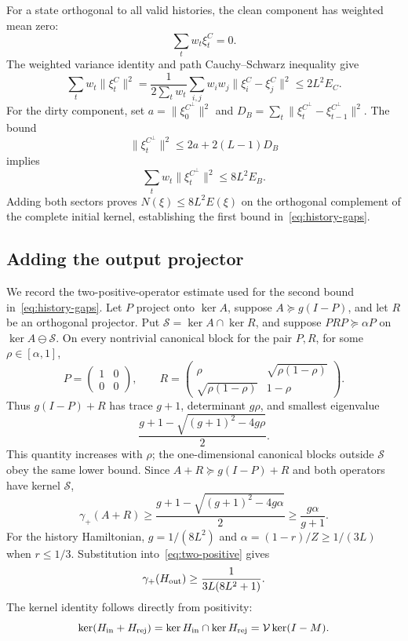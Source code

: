 For a state orthogonal to all valid histories, the clean component has weighted mean zero:
\[
\sum_tw_t\xi_t^C=0.
\]
The weighted variance identity and path Cauchy--Schwarz inequality give
\[
\sum_tw_t\|\xi_t^C\|^2
=\frac1{2\sum_tw_t}
\sum_{i,j}w_iw_j\|\xi_i^C-\xi_j^C\|^2
\le2L^2E_C.
\]
For the dirty component, set \(a=\|\xi_0^{C^\perp}\|^2\) and
\(
D_B=\sum_t\|\xi_t^{C^\perp}-\xi_{t-1}^{C^\perp}\|^2
\).
The bound
\[
\|\xi_t^{C^\perp}\|^2\le2a+2(L-1)D_B
\]
implies
\[
\sum_tw_t\|\xi_t^{C^\perp}\|^2
\le8L^2E_B.
\]
Adding both sectors proves \(N(\xi)\le8L^2E(\xi)\) on the orthogonal complement of the complete initial kernel, establishing the first bound in~\cref{eq:history-gaps}.

\subsection{Adding the output projector}

We record the two-positive-operator estimate used for the second bound in~\cref{eq:history-gaps}. Let \(P\) project onto \(\ker A\), suppose
\(A\succeq g(I-P)\), and let \(R\) be an orthogonal projector.  Put
\(\mathcal S=\ker A\cap\ker R\), and suppose \(PRP\succeq\alpha P\) on
\(\ker A\ominus\mathcal S\).  On every nontrivial canonical block for the
pair \(P,R\), for some \(\rho\in[\alpha,1]\),
\[
 P=\begin{pmatrix}1&0\\0&0\end{pmatrix},\qquad
 R=\begin{pmatrix}
 \rho&\sqrt{\rho(1-\rho)}\\
 \sqrt{\rho(1-\rho)}&1-\rho
 \end{pmatrix}.
\]
Thus \(g(I-P)+R\) has trace \(g+1\), determinant \(g\rho\), and
smallest eigenvalue
\[
 \frac{g+1-\sqrt{(g+1)^2-4g\rho}}2.
\]
This quantity increases with \(\rho\); the one-dimensional canonical blocks
outside \(\mathcal S\) obey the same lower bound.  Since
\(A+R\succeq g(I-P)+R\) and both operators have kernel \(\mathcal S\),
\begin{equation}
\label{eq:two-positive}
\gamma_+(A+R)
\ge
\frac{g+1-\sqrt{(g+1)^2-4g\alpha}}2
\ge\frac{g\alpha}{g+1}.
\end{equation}
For the history Hamiltonian, \(g=1/(8L^2)\) and \(\alpha=(1-r)/Z\ge1/(3L)\) when \(r\le1/3\). Substitution into~\cref{eq:two-positive} gives
\[
\gamma_+(H_{\rm out})
\ge\frac1{3L(8L^2+1)}.
\]
The kernel identity follows directly from positivity:
\[
\ker(H_{\rm in}+H_{\rm rej})
=\ker H_{\rm in}\cap\ker H_{\rm rej}
=\mathcal{V}\ker(I-M).
\]

